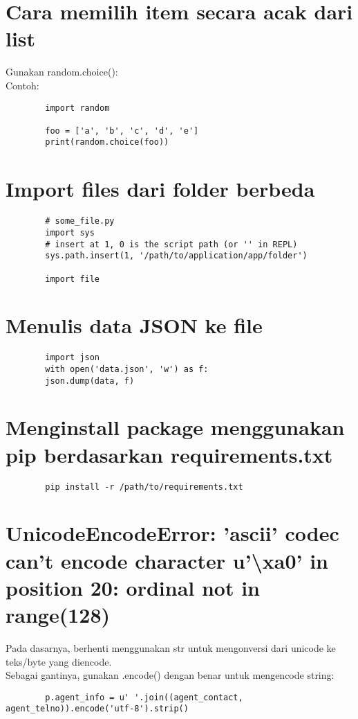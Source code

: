 \documentclass{article}
\begin{document}
	\section {Cara memilih item secara acak dari list}
	Gunakan random.choice(): \\
	Contoh:
	\begin{lstlisting}
		import random
		
		foo = ['a', 'b', 'c', 'd', 'e']
		print(random.choice(foo))
	\end{lstlisting}
	
	\section {Import files dari folder berbeda}
	\begin{lstlisting}
		# some_file.py
		import sys
		# insert at 1, 0 is the script path (or '' in REPL)
		sys.path.insert(1, '/path/to/application/app/folder')
		
		import file
	\end{lstlisting}
	
	\section {Menulis data JSON ke file}
	\begin{lstlisting}
		import json
		with open('data.json', 'w') as f:
		json.dump(data, f)
	\end{lstlisting}
	
	\section {Menginstall package menggunakan pip berdasarkan requirements.txt}
	\begin{lstlisting}
		pip install -r /path/to/requirements.txt
	\end{lstlisting}
	
	\section {UnicodeEncodeError: 'ascii' codec can't encode character u'\textbackslash xa0' in position 20: ordinal not in range(128)}
	Pada dasarnya, berhenti menggunakan str untuk mengonversi dari unicode ke teks/byte yang diencode. \\
	Sebagai gantinya, gunakan .encode() dengan benar untuk mengencode string:
	\begin{lstlisting}
		p.agent_info = u' '.join((agent_contact, agent_telno)).encode('utf-8').strip()
	\end{lstlisting}
	
\end{document}
